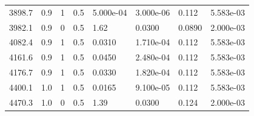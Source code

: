 \documentclass[preview]{standalone}
\begin{document}
{{\begin{tabular}{L{1.2cm}C{1.2cm} C{0.3cm}C{0.5cm} C{1.4cm}C{1.4cm} C{1.4cm}C{1.4cm}}
  3898.7  &   0.9  & 1     & 0.5 &  5.000e-04  & 3.000e-06  & 0.112 &  5.583e-03   \\ 
  3982.1  &   0.9  & 0     & 0.5 &  1.62  & 0.0300  & 0.0890 &  2.000e-03   \\ 
  4082.4  &   0.9  & 1     & 0.5 &  0.0310  & 1.710e-04  & 0.112 &  5.583e-03   \\ 
  4161.6  &   0.9  & 1     & 0.5 &  0.0450  & 2.480e-04  & 0.112 &  5.583e-03   \\ 
  4176.7  &   0.9  & 1     & 0.5 &  0.0330  & 1.820e-04  & 0.112 &  5.583e-03   \\ 
  4400.1  &   1.0  & 1     & 0.5 &  0.0165  & 9.100e-05  & 0.112 &  5.583e-03   \\ 
  4470.3  &   1.0  & 0     & 0.5 &  1.39  & 0.0300  & 0.124 &  2.000e-03   \\ 
\hline 
\end{tabular} 

}}
\end{document}
